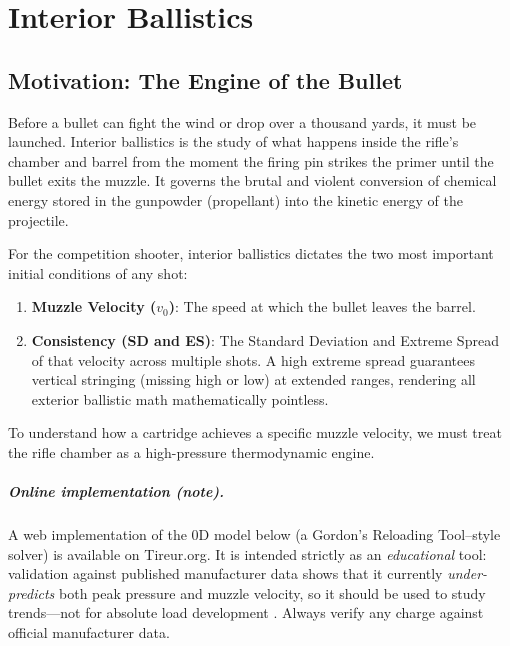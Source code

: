 \documentclass[11pt,twoside,openright]{report}
\begin{document}
\chapter{Interior Ballistics}
\label{ch:interior}

\section{Motivation: The Engine of the Bullet}

Before a bullet can fight the wind or drop over a thousand yards, it must be launched. Interior ballistics is the study of what happens inside the rifle's chamber and barrel from the moment the firing pin strikes the primer until the bullet exits the muzzle. It governs the brutal and violent conversion of chemical energy stored in the gunpowder (propellant) into the kinetic energy of the projectile.

For the competition shooter, interior ballistics dictates the two most important initial conditions of any shot:
\begin{enumerate}
    \item \textbf{Muzzle Velocity ($v_0$)}: The speed at which the bullet leaves the barrel.
    \item \textbf{Consistency (SD and ES)}: The Standard Deviation and Extreme Spread of that velocity across multiple shots. A high extreme spread guarantees vertical stringing (missing high or low) at extended ranges, rendering all exterior ballistic math mathematically pointless.
\end{enumerate}

To understand how a cartridge achieves a specific muzzle velocity, we must treat the rifle chamber as a high-pressure thermodynamic engine.

\paragraph{Online implementation (note).} A web implementation of the 0D model below (a Gordon's Reloading Tool--style solver) is available on Tireur.org. It is intended strictly as an \emph{educational} tool: validation against published manufacturer data shows that it currently \emph{under-predicts} both peak pressure and muzzle velocity, so it should be used to study trends---not for absolute load development \citep{grt_manual}. Always verify any charge against official manufacturer data.
\end{document}
